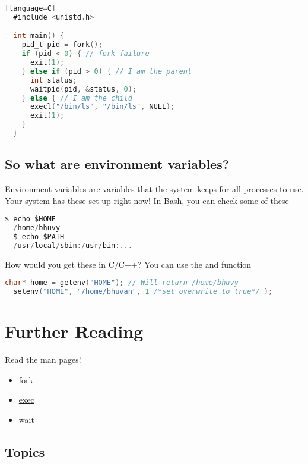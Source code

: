 \begin{lstlisting}[language=C][language=C]
  #include <unistd.h>

  int main() {
    pid_t pid = fork();
    if (pid < 0) { // fork failure
      exit(1);
    } else if (pid > 0) { // I am the parent
      int status;
      waitpid(pid, &status, 0);
    } else { // I am the child
      execl("/bin/ls", "/bin/ls", NULL);
      exit(1);
    }
  }
\end{lstlisting}

\subsection{So what are environment variables?}

Environment variables are variables that the system keeps for all processes to use. Your system has these set up right now! In Bash, you can check some of these

\begin{lstlisting}[language=C]
  $ echo $HOME
  /home/bhuvy
  $ echo $PATH
  /usr/local/sbin:/usr/bin:...
\end{lstlisting}

How would you get these in C/C++? You can use the  and  function

\begin{lstlisting}[language=C]
  char* home = getenv("HOME"); // Will return /home/bhuvy
  setenv("HOME", "/home/bhuvan", 1 /*set overwrite to true*/ );
\end{lstlisting}

\section{Further Reading}

Read the man pages! 
\begin{itemize}
\item \href{http://man7.org/linux/man-pages/man2/fork.2.html}{fork} 
\item \href{http://man7.org/linux/man-pages/man3/exec.3.html}{exec} 
\item \href{http://man7.org/linux/man-pages/man2/wait.2.html}{wait}
\end{itemize}

\subsection{Topics}

